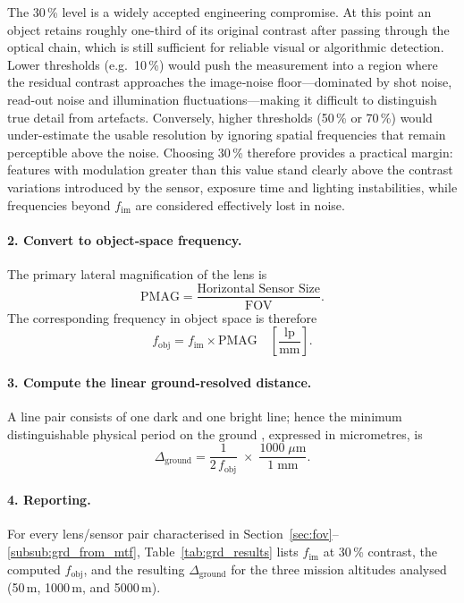 \noindent
The 30\,\% level is a widely accepted engineering compromise.  
At this point an object retains roughly one-third of its original contrast after passing
through the optical chain, which is still sufficient for reliable visual or algorithmic
detection.  
Lower thresholds (e.g.\ 10\,\%) would push the measurement into a region where the
residual contrast approaches the image‐noise floor—dominated by shot noise,
read-out noise and illumination fluctuations—making it difficult to distinguish true
detail from artefacts.  
Conversely, higher thresholds (50\,\% or 70\,\%) would under-estimate the usable
resolution by ignoring spatial frequencies that remain perceptible above the noise.
Choosing 30\,\% therefore provides a practical margin: features with modulation
greater than this value stand clearly above the contrast variations introduced by the
sensor, exposure time and lighting instabilities, while frequencies beyond
$f_{\text{im}}$ are considered effectively lost in noise.

\paragraph{2. Convert to object‑space frequency.}
The primary lateral magnification of the lens is
%
\begin{equation}
    \label{eq:pmag}
    \text{PMAG}= \frac{\text{Horizontal Sensor Size}}{\text{FOV}}.
\end{equation}
%
The corresponding frequency in object space is therefore
%
\begin{equation}
    f_{\text{obj}} = f_{\text{im}} \times \text{PMAG}
    \quad\left[\frac{\text{lp}}{\text{mm}}\right].
    \label{eq:f_obj_4}
\end{equation}

\paragraph{3. Compute the linear ground-resolved distance.}
A line pair consists of one dark and one bright line; hence the minimum
distinguishable physical period on the ground \cite{HollowsJames_Resolution_EO}, expressed in micrometres, is
%
\begin{equation}
    \Delta_{\text{ground}} =
    \frac{1}{2\,f_{\text{obj}}}\;\times\;
    \frac{1000\;\mu\text{m}}{1\;\text{mm}}.
    \label{eq:delta_ground}
\end{equation}
%

\paragraph{4. Reporting.}
For every lens/sensor pair characterised in
Section~\ref{sec:fov}--\ref{subsub:grd_from_mtf},
Table~\ref{tab:grd_results} lists
$f_{\text{im}}$ at 30\,\% contrast, the computed $f_{\text{obj}}$, and the resulting
$\Delta_{\text{ground}}$ for the three mission altitudes analysed
(50\,m, 1000\,m, and 5000\,m).

